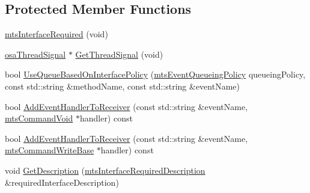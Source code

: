\subsection*{Protected Member Functions}
\begin{DoxyCompactItemize}
\item 
\hyperlink{classmts_interface_required_a3394011d351fabdfa7f341f0e6ac36bb}{mts\+Interface\+Required} (void)
\item 
\hyperlink{classosa_thread_signal}{osa\+Thread\+Signal} $\ast$ \hyperlink{classmts_interface_required_a00d93a0e2b605cfbd6251a4c29571bc7}{Get\+Thread\+Signal} (void)
\item 
bool \hyperlink{classmts_interface_required_a4a8befde3210e2786e915a16f6ecf2c7}{Use\+Queue\+Based\+On\+Interface\+Policy} (\hyperlink{mts_forward_declarations_8h_a9286ac2ca46e5bcd57059550faa96916}{mts\+Event\+Queueing\+Policy} queueing\+Policy, const std\+::string \&method\+Name, const std\+::string \&event\+Name)
\item 
bool \hyperlink{classmts_interface_required_a874737df36144428d0543bf3fdcbf079}{Add\+Event\+Handler\+To\+Receiver} (const std\+::string \&event\+Name, \hyperlink{classmts_command_void}{mts\+Command\+Void} $\ast$handler) const 
\item 
bool \hyperlink{classmts_interface_required_a59745eecdc6ee2dedd5779cff379bfed}{Add\+Event\+Handler\+To\+Receiver} (const std\+::string \&event\+Name, \hyperlink{classmts_command_write_base}{mts\+Command\+Write\+Base} $\ast$handler) const 
\item 
void \hyperlink{classmts_interface_required_abc1c41cecdfa6d2970bafd9bd11d57ed}{Get\+Description} (\hyperlink{classmts_interface_required_description}{mts\+Interface\+Required\+Description} \&required\+Interface\+Description)
\end{DoxyCompactItemize}
